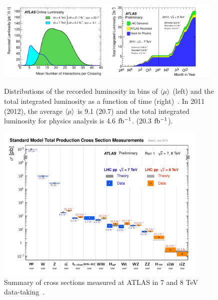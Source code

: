 \begin{figure}[tp]
  \centering
  \includegraphics[width=0.48\textwidth]{figures/lhc-atlas/mu_2011_2012-dec}
  \includegraphics[width=0.48\textwidth]{figures/lhc-atlas/intlumivstime2011-2012DQ}
  \caption{Distributions of the recorded luminosity in bins of $\langle\mu\rangle$ (left) and the total integrated luminosity as a function of time (right)~\cite{atlas-lumi}. In 2011 (2012), the average $\langle\mu\rangle$ is 9.1 (20.7) and the total integrated luminosity for physics analysis is 4.6 $\mbox{fb$^{-1}$}$. (20.3 $\mbox{fb$^{-1}$}$).}
  \label{fig:atlas-lumi-2}
\end{figure}

\begin{figure}[tp]
  \centering
  \includegraphics[width=0.90\textwidth]{figures/lhc-atlas/ATLAS_a_SMSummary_TotalXsect}
  \caption{Summary of cross sections measured at ATLAS in 7 and 8 TeV data-taking~\cite{2015.atlas-summary-SM}.}
  \label{fig:atlas-measurements}
\end{figure}

